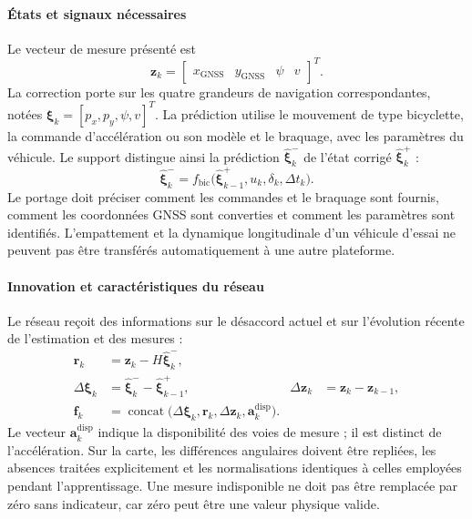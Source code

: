 \paragraph{États et signaux nécessaires}
Le vecteur de mesure présenté est
\begin{equation}
\boldsymbol{z}_k=
\begin{bmatrix}x_{\mathrm{GNSS}}&y_{\mathrm{GNSS}}&\psi&v\end{bmatrix}^{T}.
\end{equation}
La correction porte sur les quatre grandeurs de navigation correspondantes, notées $\boldsymbol{\xi}_k=[p_x,p_y,\psi,v]^T$. La prédiction utilise le mouvement de type bicyclette, la commande d'accélération ou son modèle et le braquage, avec les paramètres du véhicule. Le support distingue ainsi la prédiction $\widehat{\boldsymbol{\xi}}^-_k$ de l'état corrigé $\widehat{\boldsymbol{\xi}}^+_k$ :
\begin{equation}
\widehat{\boldsymbol{\xi}}^-_k=
f_{\mathrm{bic}}\bigl(\widehat{\boldsymbol{\xi}}^+_{k-1},u_k,\delta_k,\Delta t_k\bigr).
\end{equation}
Le portage doit préciser comment les commandes et le braquage sont fournis, comment les coordonnées GNSS sont converties et comment les paramètres sont identifiés. L'empattement et la dynamique longitudinale d'un véhicule d'essai ne peuvent pas être transférés automatiquement à une autre plateforme.

\paragraph{Innovation et caractéristiques du réseau}
Le réseau reçoit des informations sur le désaccord actuel et sur l'évolution récente de l'estimation et des mesures :
\begin{align}
\boldsymbol{r}_k &=\boldsymbol{z}_k-H\widehat{\boldsymbol{\xi}}^-_k,\\
\Delta\boldsymbol{\xi}_k&=\widehat{\boldsymbol{\xi}}^-_k-\widehat{\boldsymbol{\xi}}^+_{k-1},
&\Delta\boldsymbol{z}_k&=\boldsymbol{z}_k-\boldsymbol{z}_{k-1},\\
\boldsymbol{f}_k&=\operatorname{concat}
\bigl(\Delta\boldsymbol{\xi}_k,\boldsymbol{r}_k,
\Delta\boldsymbol{z}_k,\boldsymbol{a}^{\mathrm{disp}}_k\bigr).
\end{align}
Le vecteur $\boldsymbol{a}^{\mathrm{disp}}_k$ indique la disponibilité des voies de mesure ; il est distinct de l'accélération. Sur la carte, les différences angulaires doivent être repliées, les absences traitées explicitement et les normalisations identiques à celles employées pendant l'apprentissage. Une mesure indisponible ne doit pas être remplacée par zéro sans indicateur, car zéro peut être une valeur physique valide.

